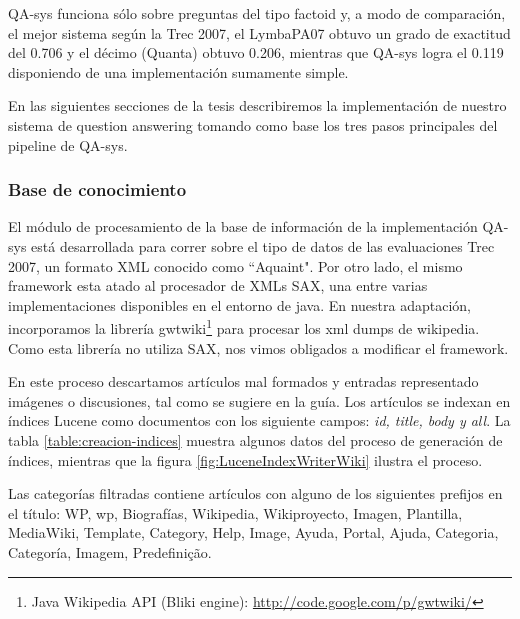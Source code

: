 QA-sys funciona sólo sobre preguntas del tipo
factoid y, a modo de comparación, el mejor sistema según la Trec
2007, el LymbaPA07 obtuvo un grado de exactitud del 0.706 y el décimo
(Quanta) obtuvo 0.206, mientras que QA-sys logra el 0.119 disponiendo de una implementación sumamente simple.

En las siguientes secciones de la tesis describiremos la implementación de nuestro sistema de question answering tomando como base los tres pasos principales del pipeline de QA-sys.

\subsubsection{Base de conocimiento}

El módulo de procesamiento de la base de información de la implementación QA-sys está desarrollada para correr sobre el tipo de datos de las evaluaciones Trec 2007, un formato XML conocido como ``Aquaint". Por otro lado, el mismo framework esta atado al procesador de XMLs SAX, una entre varias implementaciones disponibles en el entorno de java. En nuestra adaptación, incorporamos la librería gwtwiki\footnote{Java Wikipedia API (Bliki engine): \url{http://code.google.com/p/gwtwiki/}} para procesar los xml dumps de wikipedia. Como esta librería no utiliza SAX, nos vimos obligados a modificar el framework.

En este proceso descartamos artículos mal formados y entradas representado imágenes o discusiones, tal como se sugiere en la guía.
Los artículos se indexan en índices Lucene como documentos con los siguiente campos: \emph{id, title, body y all}.
La tabla \ref{table:creacion-indices} muestra algunos datos del proceso de generación de índices, mientras que la figura \ref{fig:LuceneIndexWriterWiki} ilustra el proceso.

Las categorías filtradas contiene artículos con alguno de los siguientes prefijos en el título: WP, wp, Biografías, Wikipedia, Wikiproyecto, Imagen, Plantilla, MediaWiki, Template, Category, Help, Image, Ayuda, Portal, Ajuda, Categoria, Categoría, Imagem, Predefinição.


